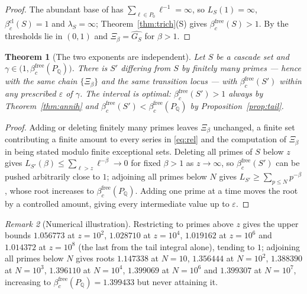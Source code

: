 \documentclass[11pt]{amsart}
\numberwithin{equation}{section}
\newtheorem{theorem}{Theorem}[section]
\theoremstyle{definition}
\theoremstyle{remark}
\newtheorem{remark}[theorem]{Remark}
\newcommand{\Q}{\mathbb{Q}}
\newcommand{\bfree}{\beta_c^{\mathrm{free}}}
\newcommand{\bcl}{\beta_c^{\mathrm{cl}}}
\begin{document}
\begin{proof}
The abundant base of \cite[Lem.~5.4(1)]{SeriesI} has $\sum_{\ell\in P_0}\ell^{-1}=\infty$, so
$L_S(1)=\infty$, $\bcl(S)=1$ and $\lambda_S=\infty$; Theorem~\ref{thm:trich}(S) gives
$\bfree(S)>1$. By \cite[Thm.~5.1(3)]{SeriesI} the thresholds lie in $(0,1)$ and
$\Xi_\beta=\widehat{G_S}$ for $\beta>1$.
\end{proof}

\begin{theorem}[The two exponents are independent]\label{thm:tune}
Let $S$ be a cascade set and $\gamma\in\bigl(1,\bfree(P_\Q)\bigr)$. There is $S'$ differing
from $S$ by finitely many primes --- hence with the same chain $\{\Xi_\beta\}$ and the same
transition locus --- with $\bfree(S')$ within any prescribed $\varepsilon$ of $\gamma$. The
interval is optimal: $\bfree(S')>1$ always by Theorem~\ref{thm:annih} and
$\bfree(S')<\bfree(P_\Q)$ by Proposition~\ref{prop:tail}.
\end{theorem}

\begin{proof}
Adding or deleting finitely many primes leaves $\Xi_\beta$ unchanged, a finite set
contributing a finite amount to every series in \eqref{eq:rel} and the computation of
$\Xi_\beta$ in \cite[Thm.~5.1]{SeriesI} being stated modulo finite exceptional sets.
Deleting all primes of $S$ below $z$ gives
$L_{S'}(\beta)\le\sum_{\ell>z}\ell^{-\beta}\to0$ for fixed $\beta>1$ as $z\to\infty$, so
$\bfree(S')$ can be pushed arbitrarily close to $1$; adjoining all primes below $N$ gives
$L_{S'}\ge\sum_{p\le N}p^{-\beta}$, whose root increases to $\bfree(P_\Q)$. Adding one prime
at a time moves the root by a controlled amount, giving every intermediate value up to
$\varepsilon$.
\end{proof}

\begin{remark}[Numerical illustration]\label{rem:tuning}
Restricting to primes above $z$ gives the upper bounds $1.056773$ at $z=10^2$, $1.028710$ at
$z=10^4$, $1.019162$ at $z=10^6$ and $1.014372$ at $z=10^8$ (the last from the tail
integral alone), tending to $1$; adjoining all
primes below $N$ gives roots $1.147338$ at $N=10$, $1.356444$ at $N=10^2$, $1.388390$ at
$N=10^3$, $1.396110$ at $N=10^4$, $1.399069$ at $N=10^6$ and $1.399307$ at $N=10^7$,
increasing to $\bfree(P_\Q)=1.399433$ but never attaining it.
\end{remark}
\end{document}
